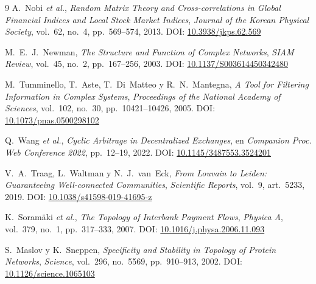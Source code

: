 \begin{thebibliography}{9}
A.~Nobi \textit{et al.},
\textit{Random Matrix Theory and Cross-correlations in Global Financial Indices
and Local Stock Market Indices},
\textit{Journal of the Korean Physical Society}, vol.~62, no.~4,
pp.~569--574, 2013.
DOI: \href{https://doi.org/10.3938/jkps.62.569}{10.3938/jkps.62.569}

M.~E.~J.~Newman,
\textit{The Structure and Function of Complex Networks},
\textit{SIAM Review}, vol.~45, no.~2, pp.~167--256, 2003.
DOI: \href{https://doi.org/10.1137/S003614450342480}{10.1137/S003614450342480}

M.~Tumminello, T.~Aste, T.~Di~Matteo y R.~N.~Mantegna,
\textit{A Tool for Filtering Information in Complex Systems},
\textit{Proceedings of the National Academy of Sciences}, vol.~102, no.~30,
pp.~10421--10426, 2005.
DOI: \href{https://doi.org/10.1073/pnas.0500298102}{10.1073/pnas.0500298102}

Q.~Wang \textit{et al.},
\textit{Cyclic Arbitrage in Decentralized Exchanges},
en \textit{Companion Proc. Web Conference 2022}, pp.~12--19, 2022.
DOI: \href{https://doi.org/10.1145/3487553.3524201}{10.1145/3487553.3524201}

V.~A.~Traag, L.~Waltman y N.~J.~van~Eck,
\textit{From Louvain to Leiden: Guaranteeing Well-connected Communities},
\textit{Scientific Reports}, vol.~9, art.~5233, 2019.
DOI: \href{https://doi.org/10.1038/s41598-019-41695-z}{10.1038/s41598-019-41695-z}

K.~Soram\"{a}ki \textit{et al.},
\textit{The Topology of Interbank Payment Flows},
\textit{Physica A}, vol.~379, no.~1, pp.~317--333, 2007.
DOI: \href{https://doi.org/10.1016/j.physa.2006.11.093}{10.1016/j.physa.2006.11.093}

S.~Maslov y K.~Sneppen,
\textit{Specificity and Stability in Topology of Protein Networks},
\textit{Science}, vol.~296, no.~5569, pp.~910--913, 2002.
DOI: \href{https://doi.org/10.1126/science.1065103}{10.1126/science.1065103}

\end{thebibliography}
